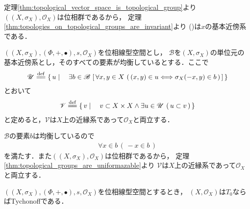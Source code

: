 	\begin{sketch}
		定理\ref{thm:topological_vector_space_is_topological_group}より
		$\left(\left(X,\sigma_X\right),\mathscr{O}_X\right)$は位相群であるから，
		定理\ref{thm:topologies_on_topological_groups_are_invariant}より
		()は$x$の基本近傍系である．
		\QED
	\end{sketch}
	
	\begin{screen}
		\begin{thm}[位相線型空間は一様化可能である]\label{thm:topological_vector_spaces_are_uniformazable}
			$\left(\left(X,\sigma_X\right),(\Phi,+,\bullet),s,\mathscr{O}_X\right)$を位相線型空間とし，
			$\mathscr{B}$を$\left(X,\sigma_X\right)$の単位元の基本近傍系とし，そのすべての要素が均衡しているとする．ここで
			\begin{align}
				\mathscr{U} \defeq \Set{u}{\exists b \in \mathscr{B}\,
				\left[\, \forall x,y \in X\, \left(\, (x,y) \in u \Longleftrightarrow\sigma_X(-x,y) \in b\, \right)\, \right]}
			\end{align}
			とおいて
			\begin{align}
				\mathscr{V} \defeq \Set{v}{v \subset X \times X \wedge \exists u \in \mathscr{U}\, \left(\, u \subset v\, \right)}
			\end{align}
			と定めると，$\mathscr{V}$は$X$上の近縁系であって$\mathscr{O}_X$と両立する．
		\end{thm}
	\end{screen}
	
	\begin{sketch}
		$\mathscr{B}$の要素$b$は均衡しているので
		\begin{align}
			\forall x \in b\, (\, -x \in b\, )
		\end{align}
		を満たす．また$\left(\left(X,\sigma_X\right),\mathscr{O}_X\right)$は位相群であるから，
		定理\ref{thm:topological_groups_are_uniformazable}より
		$\mathscr{V}$は$X$上の近縁系であって$\mathscr{O}_X$と両立する．
		\QED
	\end{sketch}
	
	\begin{screen}
		\begin{thm}
			$\left(\left(X,\sigma_X\right),(\Phi,+,\bullet),s,\mathscr{O}_X\right)$を位相線型空間とするとき，
			$\left(X,\mathscr{O}_X\right)$は$T_0$ならばTychonoffである．
		\end{thm}
	\end{screen}
	
